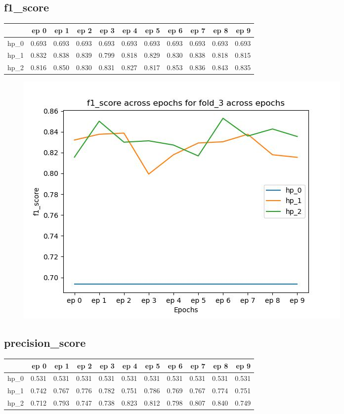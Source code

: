 \documentclass{article}
\begin{document}
\subsection{f1\_score}
\begin{tabular}{lrrrrrrrrrr}
\toprule
{} &   ep 0 &   ep 1 &   ep 2 &   ep 3 &   ep 4 &   ep 5 &   ep 6 &   ep 7 &   ep 8 &   ep 9 \\
\midrule
hp\_0 &  0.693 &  0.693 &  0.693 &  0.693 &  0.693 &  0.693 &  0.693 &  0.693 &  0.693 &  0.693 \\
hp\_1 &  0.832 &  0.838 &  0.839 &  0.799 &  0.818 &  0.829 &  0.830 &  0.838 &  0.818 &  0.815 \\
hp\_2 &  0.816 &  0.850 &  0.830 &  0.831 &  0.827 &  0.817 &  0.853 &  0.836 &  0.843 &  0.835 \\
\bottomrule
\end{tabular}

\begin{figure}[H]
\includegraphics[scale = 0.75]{fold_3/f1_score}
\end{figure}
\subsection{precision\_score}
\begin{tabular}{lrrrrrrrrrr}
\toprule
{} &   ep 0 &   ep 1 &   ep 2 &   ep 3 &   ep 4 &   ep 5 &   ep 6 &   ep 7 &   ep 8 &   ep 9 \\
\midrule
hp\_0 &  0.531 &  0.531 &  0.531 &  0.531 &  0.531 &  0.531 &  0.531 &  0.531 &  0.531 &  0.531 \\
hp\_1 &  0.742 &  0.767 &  0.776 &  0.782 &  0.751 &  0.786 &  0.769 &  0.767 &  0.774 &  0.751 \\
hp\_2 &  0.712 &  0.793 &  0.747 &  0.738 &  0.823 &  0.812 &  0.798 &  0.807 &  0.840 &  0.749 \\
\bottomrule
\end{tabular}
\end{document}
